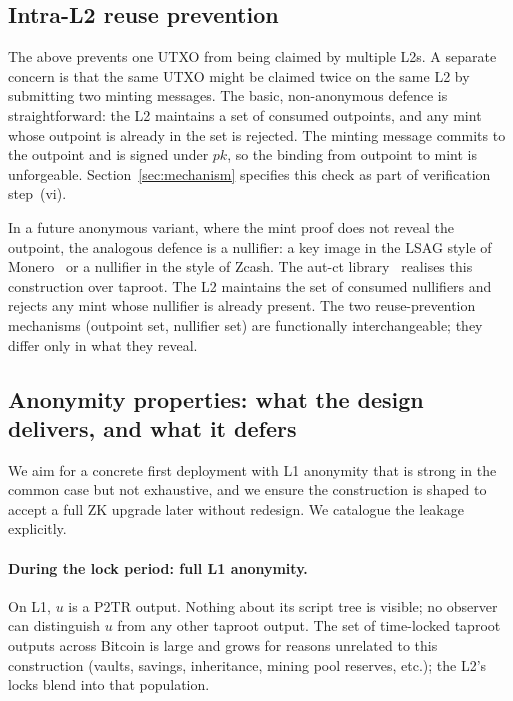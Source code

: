 \documentclass[11pt,a4paper]{article}
\begin{document}
\subsection{Intra-L2 reuse prevention}

The above prevents one UTXO from being claimed by multiple L2s. A separate concern is that the same UTXO might be claimed twice on the same L2 by submitting two minting messages. The basic, non-anonymous defence is straightforward: the L2 maintains a set of consumed outpoints, and any mint whose outpoint is already in the set is rejected. The minting message commits to the outpoint and is signed under $pk$, so the binding from outpoint to mint is unforgeable. Section~\ref{sec:mechanism} specifies this check as part of verification step~(vi).

In a future anonymous variant, where the mint proof does not reveal the outpoint, the analogous defence is a nullifier: a key image in the LSAG style of Monero~\cite{lsag} or a nullifier in the style of Zcash. The aut-ct library~\cite{autct} realises this construction over taproot. The L2 maintains the set of consumed nullifiers and rejects any mint whose nullifier is already present. The two reuse-prevention mechanisms (outpoint set, nullifier set) are functionally interchangeable; they differ only in what they reveal.

\subsection{Anonymity properties: what the design delivers, and what it defers}

\label{sec:anon}

We aim for a concrete first deployment with L1 anonymity that is strong in the common case but not exhaustive, and we ensure the construction is shaped to accept a full ZK upgrade later without redesign. We catalogue the leakage explicitly.

\paragraph{During the lock period: full L1 anonymity.} On L1, $u$ is a P2TR output. Nothing about its script tree is visible; no observer can distinguish $u$ from any other taproot output. The set of time-locked taproot outputs across Bitcoin is large and grows for reasons unrelated to this construction (vaults, savings, inheritance, mining pool reserves, etc.); the L2's locks blend into that population.
\end{document}

